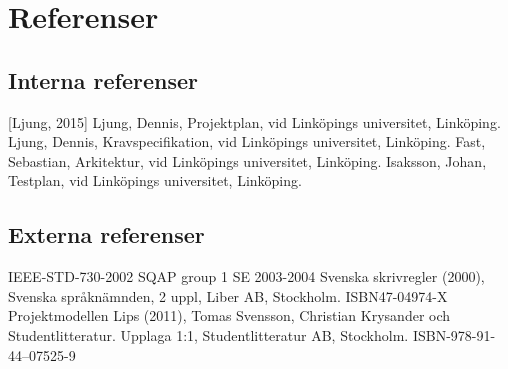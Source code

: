 \section{Referenser}


\subsection{Interna referenser}
[Ljung, 2015] Ljung, Dennis, Projektplan, vid Linköpings universitet, Linköping.
\newline
\newline
[Ljung, 2015] Ljung, Dennis, Kravspecifikation, vid Linköpings universitet, Linköping.
\newline
\newline
[Fast, 2015] Fast, Sebastian, Arkitektur, vid Linköpings universitet, Linköping.
\newline
\newline
[Isaksson, 2015] Isaksson, Johan, Testplan, vid Linköpings universitet, Linköping.

\subsection{Externa referenser}
IEEE-STD-730-2002 SQAP group 1 SE 2003-2004
\newline
\newline
Svenska skrivregler (2000), Svenska språknämnden, 2 uppl, Liber AB, Stockholm. ISBN47-04974-X
\newline
\newline
Projektmodellen Lips (2011), Tomas Svensson, Christian Krysander och Studentlitteratur. Upplaga 1:1, Studentlitteratur AB, Stockholm. ISBN-978-91-44--07525-9
